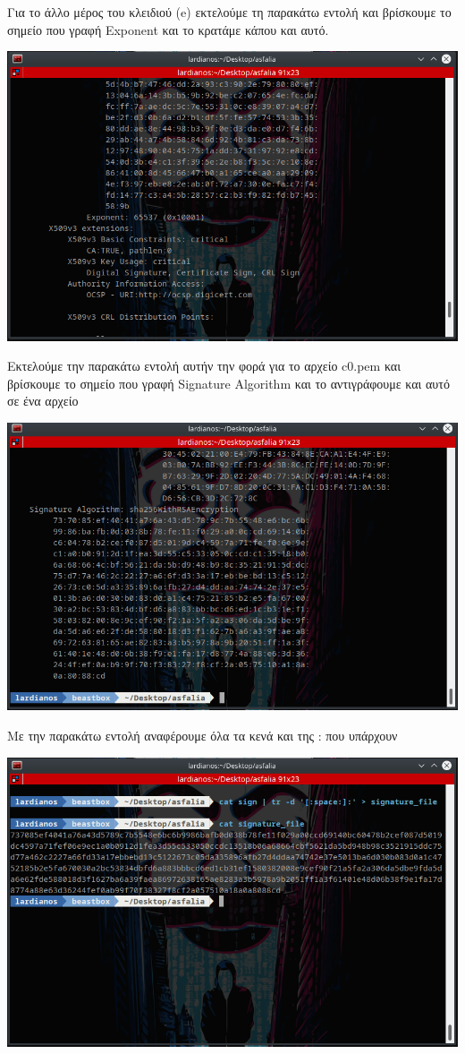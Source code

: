 \noindent
Για το άλλο μέρος του κλειδιού (e) εκτελούμε τη παρακάτω εντολή και βρίσκουμε 
το σημείο που γραφή Exponent και το κρατάμε κάπου και αυτό.
\begin{center}
			\includegraphics[width=1\textwidth]{image/image36term3.PNG}		
\end{center}
\noindent
Εκτελούμε την παρακάτω εντολή αυτήν την φορά για το αρχείο c0.pem
και βρίσκουμε το σημείο που γραφή Signature Algorithm και το αντιγράφουμε και αυτό σε ένα αρχείο
\begin{center}
			\includegraphics[width=1\textwidth]{image/image36term4.PNG}		
\end{center}
\noindent
Με την παρακάτω εντολή αναφέρουμε όλα τα κενά και της : που υπάρχουν 
\begin{center}
			\includegraphics[width=1\textwidth]{image/image36term5.PNG}		
\end{center}
